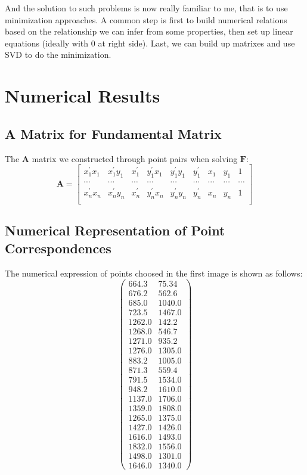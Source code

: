 \documentclass[conference]{IEEEtran}
\newcommand{\mat}[1]{\mathbf{#1}} %
\begin{document}
And the solution to such problems is now really familiar to me, that is to use minimization approaches. A common step is first to build numerical relations based on the relationship we can infer from some properties, then set up linear equations (ideally with 0 at right side). Last, we can build up matrixes and use SVD to do the minimization.

\onecolumn
\section{Numerical Results}
\subsection{A Matrix for Fundamental Matrix}
The $\mat{A}$ matrix we constructed through point pairs when solving $\mat{F}$:
\begin{equation}
	\mat{A} = \begin{bmatrix}
		x_1^\prime x_1 & x_1^\prime y_1 & x_1^\prime & y_1^\prime x_1	& y_1^\prime y_1 & y_1^\prime & x_1 & y_1 & 1\\
		\cdots & \cdots & \cdots & \cdots & \cdots & \cdots & \cdots & \cdots & \cdots \\
		x_n^\prime x_n & x_n^\prime y_n & x_n^\prime & y_n^\prime x_n	& y_n^\prime y_n & y_n^\prime & x_n & y_n & 1\\
	\end{bmatrix}
\end{equation}
\subsection{Numerical Representation of Point Correspondences}
The numerical expression of points choosed in the first image is shown as follows:
\begin{equation}
	\left(\begin{array}{cc} 664.3 & 75.34\\ 676.2 & 562.6\\ 685.0 & 1040.0\\ 723.5 & 1467.0\\ 1262.0 & 142.2\\ 1268.0 & 546.7\\ 1271.0 & 935.2\\ 1276.0 & 1305.0\\ 883.2 & 1005.0\\ 871.3 & 559.4\\ 791.5 & 1534.0\\ 948.2 & 1610.0\\ 1137.0 & 1706.0\\ 1359.0 & 1808.0\\ 1265.0 & 1375.0\\ 1427.0 & 1426.0\\ 1616.0 & 1493.0\\ 1832.0 & 1556.0\\ 1498.0 & 1301.0\\ 1646.0 & 1340.0 \end{array}\right)
\end{equation}
\end{document}
